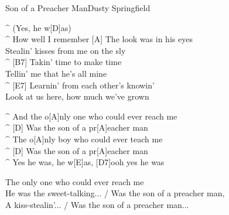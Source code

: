 \begin{song}{Son of a Preacher Man}{Dusty Springfield}

\begin{guitar}
^ (Yes, he w[D]as) \\
^ How well I remember [A] The look was in his eyes\\
Stealin' kisses from me on the sly\\
^ [B7]   Takin' time to make time\\
Tellin' me that he's all mine\\
^ [E7]  Learnin' from each other's knowin'\\
Look at us here, how much we've grown\\
\end{guitar}

\begin{guitar}
^ And the o[A]nly one who could ever reach me\\
^ [D]  Was the son of a pr[A]eacher man\\
^ The o[A]nly boy who could ever teach me\\
^ [D]  Was the son of a pr[A]eacher man\\
^ Yes he was, he w[E]as, [D7]ooh yes he was\\
\end{guitar}

\begin{guitar}
The only one who could ever reach me\\
He was the sweet-talking... / Was the son of a preacher man,\\
A kiss-stealin'... / Was the son of a preacher man...\\
\end{guitar}

\end{song}

